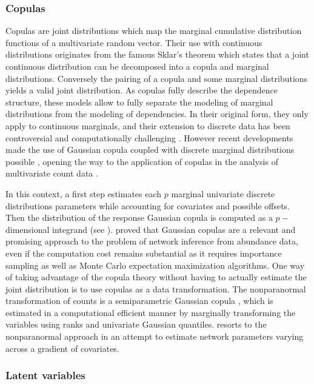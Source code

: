 \subsubsection{Copulas}
  
Copulas are  joint  distributions which map the marginal  cumulative distribution functions of a multivariate random vector. Their use with continuous distributions originates from the famous Sklar's theorem which states that a joint continuous distribution can be decomposed into a copula and marginal distributions. Conversely the pairing of a copula and some marginal distributions yields a valid joint distribution. As copulas fully describe the dependence structure, these models allow to fully separate the modeling of marginal distributions from the modeling of dependencies. In their original form, they only apply to continuous marginals, and their extension to discrete data has been controversial and computationally challenging \citep{F17}. However recent developments made the use of  Gaussian copula coupled with discrete marginal distributions possible \citep{PCJ12,PHW18}, opening the way to the application of copulas in the analysis of multivariate count data \citep{AVP19}. 

In this context, a first step estimates each $p$ marginal univariate discrete distributions parameters while accounting for covariates and possible offsets. Then the distribution of the response Gaussian copula is computed as a $p-$dimensional integrand (see \citet{PHW18}). \citet{PWT19} proved that  Gaussian copulas are a relevant and promising approach to the problem of network inference from abundance data, even if the computation cost remains substantial as it requires importance sampling as well as Monte Carlo expectation maximization algorithms. One way of taking advantage of the copula theory without having to actually estimate the joint distribution is to use copulas as a data transformation. The nonparanormal transformation of counts is a semiparametric Gaussian copula \citep{LLW09}, which is estimated in a computational efficient manner by marginally transforming the variables using ranks and univariate Gaussian quantiles. \cite{CWL18} resorts to the nonparanormal approach in an attempt to estimate network parameters varying across a gradient of covariates. 

\subsubsection{Latent variables}

